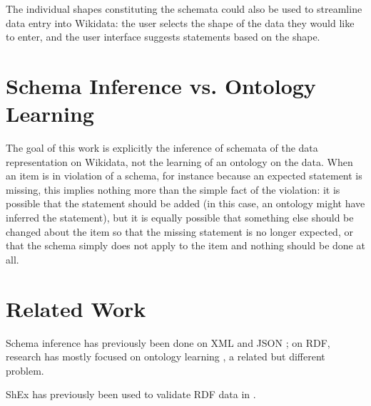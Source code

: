 \documentclass{scrartcl}
\begin{document}
The individual shapes constituting the schemata could also be used to streamline data entry into Wikidata:
the user selects the shape of the data they would like to enter,
and the user interface suggests statements based on the shape.

\section{Schema Inference vs. Ontology Learning}

The goal of this work is explicitly the inference of schemata of the data representation on Wikidata,
not the learning of an ontology on the data.
When an item is in violation of a schema,
for instance because an expected statement is missing,
this implies nothing more than the simple fact of the violation:
it is possible that the statement should be added
(in this case, an ontology might have inferred the statement),
but it is equally possible that something else should be changed about the item so that the missing statement is no longer expected,
or that the schema simply does not apply to the item and nothing should be done at all.

\section{Related Work}

Schema inference has previously been done on XML \cite{Bex:2007:IXS:1325851.1325964} and JSON \cite{json-inference};
on RDF, research has mostly focused on ontology learning \cite{Zhou2007}, a related but different problem.

ShEx has previously been used to validate RDF data in \cite{SOLBRIG201790}.



\end{document}
